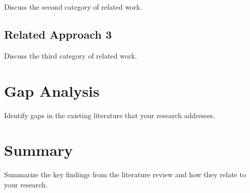 Discuss the second category of related work.

\subsection{Related Approach 3}
\label{subsec:approach3}

Discuss the third category of related work.

\section{Gap Analysis}
\label{sec:gap-analysis}

Identify gaps in the existing literature that your research addresses.

\section{Summary}
\label{sec:lit-summary}

Summarize the key findings from the literature review and how they relate to your research.
